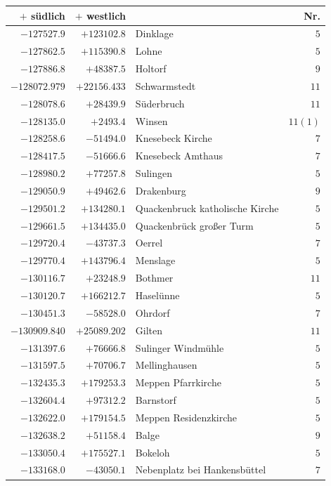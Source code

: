 \clearpage{}%
\begin{center}\begingroup\fontsize{8}{9}\selectfont
\setlength{\tabcolsep}{4pt}
\begin{tabular}{r|r|p{170pt}|r}\hline
\(+\) südlich&\(+\) westlich&&Nr.\\\hline
\(-127527.9\)&\(+123102.8\)&Dinklage&\(5\)\\
\(-127862.5\)&\(+115390.8\)&Lohne&\(5\)\\
\(-127886.8\)&\(+48387.5\)&Holtorf&\(9\)\\
\(-128072.979\)&\(+22156.433\)&Schwarmstedt&\(11\)\\
\(-128078.6\)&\(+28439.9\)&Süderbruch&\(11\)\\
\(-128135.0\)&\(+2493.4\)&Winsen&\(11 (1)\)\\
\(-128258.6\)&\(-51494.0\)&Knesebeck Kirche&\(7\)\\
\(-128417.5\)&\(-51666.6\)&Knesebeck Amthaus&\(7\)\\
\(-128980.2\)&\(+77257.8\)&Sulingen&\(5\)\\
\(-129050.9\)&\(+49462.6\)&Drakenburg&\(9\)\\
\(-129501.2\)&\(+134280.1\)&Quackenbruck katholische Kirche&\(5\)\\
\(-129661.5\)&\(+134435.0\)&Quackenbrück großer Turm&\(5\)\\
\(-129720.4\)&\(-43737.3\)&Oerrel&\(7\)\\
\(-129770.4\)&\(+143796.4\)&Menslage&\(5\)\\
\(-130116.7\)&\(+23248.9\)&Bothmer&\(11\)\\
\(-130120.7\)&\(+166212.7\)&Haselünne&\(5\)\\
\(-130451.3\)&\(-58528.0\)&Ohrdorf&\(7\)\\
\(-130909.840\)&\(+25089.202\)&Gilten&\(11\)\\
\(-131397.6\)&\(+76666.8\)&Sulinger Windmühle&\(5\)\\
\(-131597.5\)&\(+70706.7\)&Mellinghausen&\(5\)\\
\(-132435.3\)&\(+179253.3\)&Meppen Pfarrkirche&\(5\)\\
\(-132604.4\)&\(+97312.2\)&Barnstorf&\(5\)\\
\(-132622.0\)&\(+179154.5\)&Meppen Residenzkirche&\(5\)\\
\(-132638.2\)&\(+51158.4\)&Balge&\(9\)\\
\(-133050.4\)&\(+175527.1\)&Bokeloh&\(5\)\\
\(-133168.0\)&\(-43050.1\)&Nebenplatz bei Hankensbüttel&\(7\)\\

\end{tabular}
\end{center}
